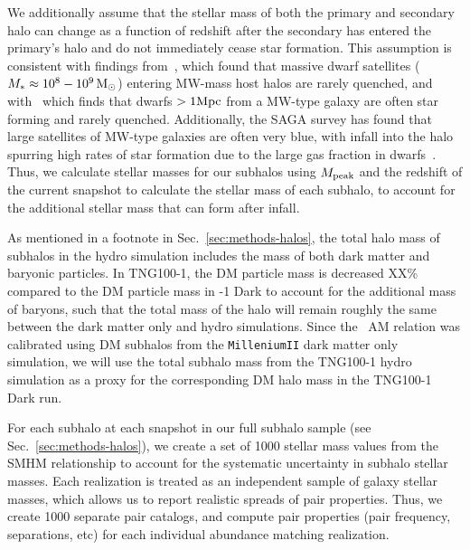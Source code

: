 \documentclass[twocolumn]{aastex631}
\begin{document}
    We additionally assume that the stellar mass of both the primary and secondary halo can change as a function of redshift after the secondary has entered the primary's halo and do not immediately cease star formation. 
    This assumption is consistent with findings from~\cite{Akins2021}, which found that massive dwarf satellites ($M_*\approx 10^8-10^9\, \mathrm{M}_\odot$) entering MW-mass host halos are rarely quenched, and with~\cite{geha13} which finds that dwarfs $>1\mathrm{Mpc}$ from a MW-type galaxy are often star forming and rarely quenched.
    Additionally, the SAGA survey has found that large satellites of MW-type galaxies are often very blue, with infall into the halo spurring high rates of star formation due to the large gas fraction in dwarfs~\citep{saga}. 
    Thus, we calculate stellar masses for our subhalos using $M_{\rm peak}$ and the redshift of the current snapshot to calculate the stellar mass of each subhalo, to account for the additional stellar mass that can form after infall. 

    As mentioned in a footnote in Sec.~\ref{sec:methods-halos}, the total halo mass of subhalos in the hydro simulation includes the mass of both dark matter and baryonic particles. 
    In TNG100-1, the DM particle mass is decreased XX\% compared to the DM particle mass in -1 Dark to account for the additional mass of baryons, such that the total mass of the halo will remain roughly the same between the dark matter only and hydro simulations. 
    Since the~\citet{Moster2013} AM relation was calibrated using DM subhalos from the \texttt{MilleniumII} dark matter only simulation, we will use the total subhalo mass from the TNG100-1 hydro simulation as a proxy for the corresponding DM halo mass in the TNG100-1 Dark run. 

    For each subhalo at each snapshot in our full subhalo sample (see Sec.~\ref{sec:methods-halos}), we create a set of 1000 stellar mass values from the SMHM relationship to account for the systematic uncertainty in subhalo stellar masses.
    Each realization is treated as an independent sample of galaxy stellar masses, which allows us to report realistic spreads of pair properties.
    Thus, we create 1000 separate pair catalogs, and compute pair properties (pair frequency, separations, etc) for each individual abundance matching realization.


\end{document}

